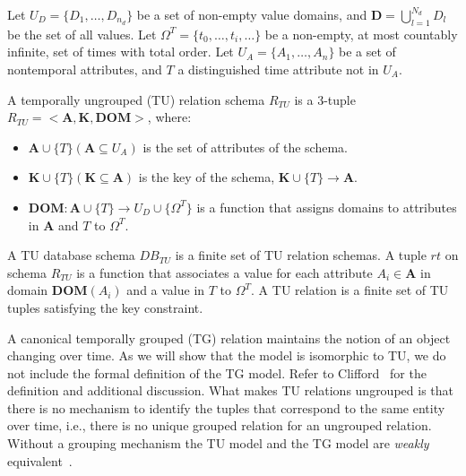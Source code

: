 \begin{definition}  Let $U_D =
\{D_1,\ldots,D_{n_d}\}$ be a set of non-empty value domains, and
$\mathbf{D} = \bigcup^{N_d}_{l=1}D_l$ be the set of all values. Let
$\Omega^T = \{t_0,\ldots,t_i,\ldots\}$ be a non-empty, at most countably
infinite, set of times with total order.  Let $U_A =
\{A_1,\ldots,A_n\}$ be a set of nontemporal attributes, and $T$ a
distinguished time attribute not in $U_A$.

A temporally ungrouped (TU) relation schema $R_{TU}$ is a 3-tuple
$R_{TU} = <\mathbf{A},\mathbf{K},\mathbf{DOM}>$, where:

\begin{itemize}[noitemsep,topsep=0pt,itemindent=\dimexpr{}+\relax,leftmargin=5pt]
\item $\mathbf{A} \cup \{T\} (\mathbf{A} \subseteq U_A)$ is the set of attributes of the schema.
\item $\mathbf{K} \cup \{T\} (\mathbf{K} \subseteq \mathbf{A})$ is the key of the schema, $\mathbf{K} \cup \{T\} \to \mathbf{A}$.
\item $\mathbf{DOM}: \mathbf{A} \cup \{T\} \to U_D \cup \{\Omega^T\}$ is a function that assigns domains to attributes in $\mathbf{A}$ and $T$ to $\Omega^T$.
\end{itemize}

A TU database schema $DB_{TU}$ is a finite set of TU relation schemas.
A tuple $rt$ on schema $R_{TU}$ is a function that associates a value
for each attribute $A_i \in \mathbf{A}$ in domain $\mathbf{DOM}(A_i)$
and a value in $T$ to $\Omega^T$.  A TU relation is a finite set of TU
tuples satisfying the key constraint.
\end{definition}


A canonical temporally grouped (TG) relation maintains the notion of
an object changing over time.  As we will show that the \tg model is
isomorphic to TU, we do not include the formal definition of the TG
model.  Refer to Clifford~\cite{Clifford1994} for the
definition and additional discussion.  What makes TU relations
ungrouped is that there is no mechanism to identify the tuples that
correspond to the same entity over time, i.e., there is no unique
grouped relation for an ungrouped relation.  Without a grouping
mechanism the TU model and the TG model are {\em weakly}
equivalent~\cite{Clifford1994}.

